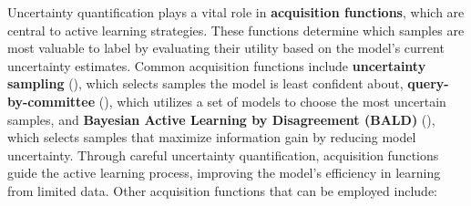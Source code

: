 \documentclass[
  letterpaper,
  numbers=noenddot,
  DIV=11]{scrreprt}
\theoremstyle{plain}
\theoremstyle{definition}
\theoremstyle{plain}
\theoremstyle{remark}
\begin{document}
Uncertainty quantification plays a vital role in \textbf{acquisition
functions}, which are central to active learning strategies. These
functions determine which samples are most valuable to label by
evaluating their utility based on the model's current uncertainty
estimates. Common acquisition functions include \textbf{uncertainty
sampling} (), which
selects samples the model is least confident about,
\textbf{query-by-committee} (), which utilizes a set of models to choose the most uncertain
samples, and \textbf{Bayesian Active Learning by Disagreement (BALD)}
(), which selects samples
that maximize information gain by reducing model uncertainty. Through
careful uncertainty quantification, acquisition functions guide the
active learning process, improving the model's efficiency in learning
from limited data. Other acquisition functions that can be employed
include:
\end{document}

